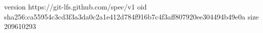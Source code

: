 version https://git-lfs.github.com/spec/v1
oid sha256:ca55954c3cd3f3a3da0c2a1e412d784f916b7c4f3aff807920ee304494b49e0a
size 209610293
